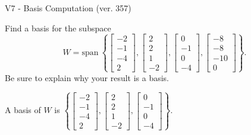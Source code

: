 \begin{exercise}
  \begin{exerciseTitle}V7 - Basis Computation (ver. 357)\end{exerciseTitle}
  \begin{exerciseStatement}
    Find a basis for the subspace 
\[W=\mathrm{span}\ \left\{\left[\begin{array}{r}
-2 \\
-1 \\
-4 \\
2
\end{array}\right] , \left[\begin{array}{r}
2 \\
2 \\
1 \\
-2
\end{array}\right] , \left[\begin{array}{r}
0 \\
-1 \\
0 \\
-4
\end{array}\right] , \left[\begin{array}{r}
-8 \\
-8 \\
-10 \\
0
\end{array}\right]\right\}.\]
 Be sure to explain why your result is a basis.


  \end{exerciseStatement}
  \begin{exerciseAnswer}
   A basis of \(W\) is  \(\left\{\left[\begin{array}{r}
-2 \\
-1 \\
-4 \\
2
\end{array}\right] , \left[\begin{array}{r}
2 \\
2 \\
1 \\
-2
\end{array}\right] , \left[\begin{array}{r}
0 \\
-1 \\
0 \\
-4
\end{array}\right]\right\}\).
  


  \end{exerciseAnswer}
\end{exercise}